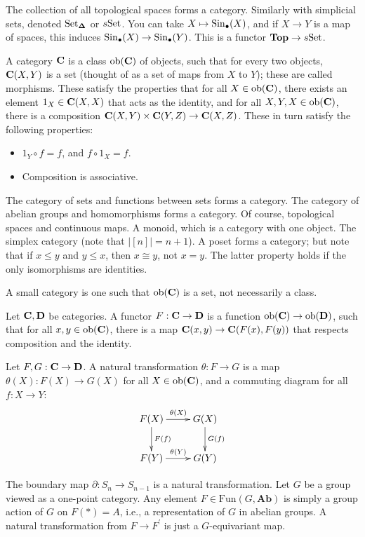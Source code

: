 The collection of all topological spaces forms a category. Similarly with simplicial sets, denoted ${\mathrm{Set}}_{\mathbf \Delta}$ or $s{\mathrm{Set}}$. You can take $X\mapsto \mathrm{Sin}_\bullet(X)$, and if $X\to Y$ is a map of spaces, this induces $\mathrm{Sin}_\bullet(X)\to\mathrm{Sin}_\bullet(Y)$. This is a functor $\mathbf{Top}\to s{\mathrm{Set}}$.
\begin{definition}
A category $\mathbf C$ is a class $\mathrm{ob}(\mathbf C)$ of objects, such that for every two objects, $\mathbf C(X,Y)$ is a set (thought of as a set of maps from $X$ to $Y$); these are called morphisms. These satisfy the properties that for all $X\in\mathrm{ob}(\mathbf C)$, there exists an element $1_X\in\mathbf C(X,X)$ that acts as the identity, and for all $X,Y,X\in\mathrm{ob}(\mathbf C)$, there is a composition $\mathbf C(X,Y)\times\mathbf C(Y,Z)\to\mathbf C(X,Z)$. These in turn satisfy the following properties:
\begin{itemize}
\item $1_Y\circ f=f$, and $f\circ 1_X=f$.
\item Composition is associative.
\end{itemize}
\end{definition}
\begin{example}
The category of sets and functions between sets forms a category. The category of abelian groups and homomorphisms forms a category. Of course, topological spaces and continuous maps. A monoid, which is a category with one object. The simplex category (note that $|[n]|=n+1$). A poset forms a category; but note that if $x\leq y$ and $y\leq x$, then $x\cong y$, not $x=y$. The latter property holds if the only isomorphisms are identities.
\end{example}
A small category is one such that $\mathrm{ob}(\mathbf C)$ is a set, not necessarily a class.
\begin{definition}
Let $\mathbf C,\mathbf D$ be categories. A functor $F:\mathbf C\to\mathbf D$ is a function $\mathrm{ob}(\mathbf C)\to\mathrm{ob}(\mathbf D)$, such that for all $x,y\in\mathrm{ob}(\mathbf C)$, there is a map $\mathbf C(x,y)\to\mathbf C(F(x),F(y))$ that respects composition and the identity.

Let $F,G:\mathbf C\to\mathbf D$. A natural transformation $\theta:F\to G$ is a map $\theta(X):F(X)\to G(X)$ for all $X\in\mathrm{ob}(\mathbf C)$, and a commuting diagram for all $f:X\to Y$:
\begin{equation*}
\xymatrix{F(X)\ar[d]^{F(f)}\ar[r]^{\theta(X)} & G(X)\ar[d]^{G(f)}\\
F(Y)\ar[r]^{\theta(Y)} & G(Y)}
\end{equation*}
\end{definition}
\begin{example}
The boundary map $\partial:S_n\to S_{n-1}$ is a natural transformation. Let $G$ be a group viewed as a one-point category. Any element $F\in\mathrm{Fun}(G,\mathbf{Ab})$ is simply a group action of $G$ on $F(\ast)=A$, i.e., a representation of $G$ in abelian groups. A natural transformation from $F\to F^\prime$ is just a $G$-equivariant map.
\end{example}
